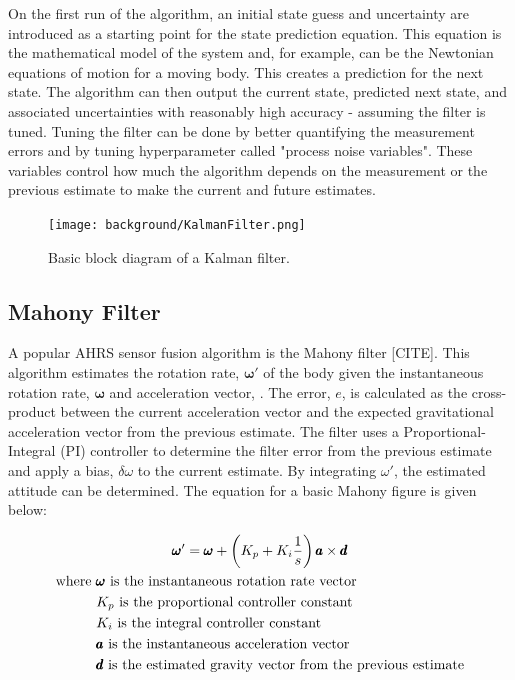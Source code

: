 On the first run of the algorithm, an initial state guess and uncertainty are introduced as a starting point for the state prediction equation.
This equation is the mathematical model of the system and, for example, can be the Newtonian equations of motion for a moving body.
This creates a prediction for the next state.
The algorithm can then output the current state, predicted next state, and associated uncertainties with reasonably high accuracy - assuming the filter is tuned.
Tuning the filter can be done by better quantifying the measurement errors and by tuning hyperparameter called "process noise variables".
These variables control how much the algorithm depends on the measurement or the previous estimate to make the current and future estimates.

\begin{figure}[h!]
    \caption[Kalman filter block diagram]{Basic block diagram of a Kalman filter.}
    \label{fig:kalman_filter}
    \centering
    \texttt{[image: background/KalmanFilter.png]}
\end{figure}

\subsection{Mahony Filter} \label{ssec:bkg_mahony_filter}
A popular AHRS sensor fusion algorithm is the Mahony filter [CITE].
This algorithm estimates the rotation rate, $\pmb{\omega}'$ of the body given the instantaneous rotation rate, $\pmb{\omega}$ and acceleration vector, .
The error, $e$, is calculated as the cross-product between the current acceleration vector and the expected gravitational acceleration vector from the previous estimate.
The filter uses a Proportional-Integral (PI) controller to determine the filter error from the previous estimate and apply a bias, $\delta\omega$ to the current estimate.
By integrating $\omega'$, the estimated attitude can be determined.
The equation for a basic Mahony figure is given below:

\begin{gather}
    \label{eq:mahony_filter}
    \pmb{\omega}' = \pmb{\omega} + \left(K_p + K_i\frac{1}{s}\right) \pmb{a} \times \pmb{d} \\
    \begin{aligned}
        \text{where } & \pmb{\omega} \text{ is the instantaneous rotation rate vector} \\
        & K_p \text{ is the proportional controller constant} \\
        & K_i \text{ is the integral controller constant} \\
        & \pmb{a} \text{ is the instantaneous acceleration vector} \\
        & \pmb{d} \text{ is the estimated gravity vector from the previous estimate} \\
    \end{aligned} \notag
\end{gather}

